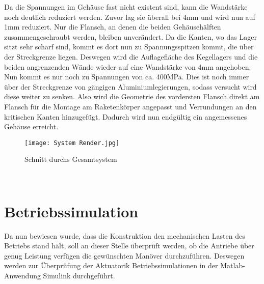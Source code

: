 Da die Spannungen im Gehäuse fast nicht existent sind, kann die Wandstärke noch deutlich reduziert werden. Zuvor lag sie überall bei 4mm und wird nun auf 1mm reduziert. Nur die Flansch, an denen die beiden Gehäusehälften zusammengeschraubt werden, bleiben unverändert. Da die Kanten, wo das Lager sitzt sehr scharf sind, kommt es dort nun zu Spannungsspitzen kommt, die über der Streckgrenze liegen. Deswegen wird die Auflagefläche des Kegellagers und die beiden angrenzenden Wände wieder auf eine Wandstärke von 4mm angehoben. Nun kommt es nur noch zu Spannungen von ca. 400MPa. Dies ist noch immer über der Streckgrenze von gängigen Aluminiumlegierungen, sodass versucht wird diese weiter zu senken. Also wird die Geometrie des vordersten Flansch direkt am Flansch für die Montage am Raketenkörper angepasst und Verrundungen an den kritischen Kanten hinzugefügt. Dadurch wird nun endgültig ein angemessenes Gehäuse erreicht.
\begin{figure}[h] 
	\centering
	\texttt{[image: System Render.jpg]}
	\caption{Schnitt durchs Gesamtsystem}
\end{figure}\\
\section{Betriebssimulation}\label{sec:betriebssim}
Da nun bewiesen wurde, dass die Konstruktion den mechanischen Lasten des Betriebs stand hält, soll an dieser Stelle überprüft werden, ob die Antriebe über genug Leistung verfügen die gewünschten Manöver durchzuführen. Deswegen werden zur Überprüfung der Aktuatorik Betriebssimulationen in der Matlab-Anwendung Simulink durchgeführt.
